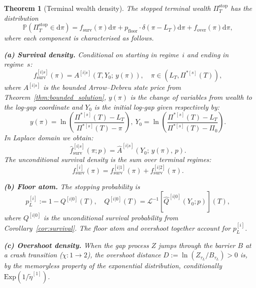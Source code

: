 \documentclass[11pt,a4paper]{article}
\numberwithin{equation}{section}
\newtheorem{theorem}{Theorem}[section]
\newcommand{\Prob}{\mathbb{P}}
\newcommand{\Lp}{\mathcal{L}}
\newcommand{\dd}{\mathrm{d}}
\begin{document}
\begin{theorem}[Terminal wealth density]\label{thm:wealth_density}
The stopped terminal wealth $\Pi^{\mathrm{stop}}_T$ has the distribution
\begin{equation}\label{eq:wealth_density}
\Prob(\Pi^{\mathrm{stop}}_T \in \dd\pi) = f_{\mathrm{surv}}(\pi)\dd\pi + p_{\mathrm{floor}} \cdot \delta(\pi - L_T)\dd\pi + f_{\mathrm{over}}(\pi)\dd\pi,
\end{equation}
where each component is characterised as follows.

\medskip\noindent\textbf{(a) Survival density.} Conditional on starting in regime~$i$ and ending in regime~$s$:
\begin{equation}\label{eq:surv_density}
f^{[i|s]}_{\mathrm{surv}}(\pi) = A^{[i|s]}(T, Y_0;\, y(\pi)), \quad \pi \in (L_T, \Pi^{*[s]}(T)),
\end{equation}
where  $A^{[i|s]}$ is the bounded Arrow--Debreu state price from Theorem~\ref{thm:bounded_solution}, $y(\pi)$ is the change of variables from wealth to the log-gap coordinate and $Y_0$ is the initial log-gap given respectively by:
\begin{equation}\label{eq:surv_density_1}
y(\pi) = \ln\!\left(\frac{\Pi^{*[s]}(T) - L_T}{\Pi^{*[s]}(T) - \pi}\right), \ Y_0 = \ln\!\left(\frac{\Pi^{*[s]}(T) - L_T}{\Pi^{*[s]}(T) - \Pi_0}\right).
\end{equation}
In Laplace domain we obtain:
\begin{equation}\label{eq:surv_density_laplace}
\hat{f}^{[i|s]}_{\mathrm{surv}}(\pi; p) = \hat{A}^{[i|s]}(Y_0;\, y(\pi),\, p).
\end{equation}
The unconditional survival density is the sum over terminal regimes:
\begin{equation}
f^{[i]}_{\mathrm{surv}}(\pi) = f^{[i|1]}_{\mathrm{surv}}(\pi) + f^{[i|2]}_{\mathrm{surv}}(\pi).
\end{equation}

\medskip\noindent\textbf{(b) Floor atom.} The stopping probability is
\begin{equation}\label{eq:total_stop}
p^{[i]}_L := 1 - Q^{[i|0]}(T), \quad Q^{[i|0]}(T) = \Lp^{-1}\!\left[\hat{Q}^{[i|0]}(Y_0; p)\right](T),
\end{equation}
where $Q^{[i|0]}$ is the unconditional survival probability from Corollary~\ref{cor:survival}. The floor atom and overshoot together account for $p^{[i]}_L$.

\medskip\noindent\textbf{(c) Overshoot density.} When the gap process $Z$ jumps through the barrier $B$ at a crash transition ($\chi: 1 \to 2$), the overshoot distance $D := \ln(Z_{\tau_L}/B_{\tau_L}) > 0$ is, by the memoryless property of the exponential distribution, conditionally $\mathrm{Exp}(1/\tilde\eta^{[1]})$.


\end{theorem}
\end{document}
